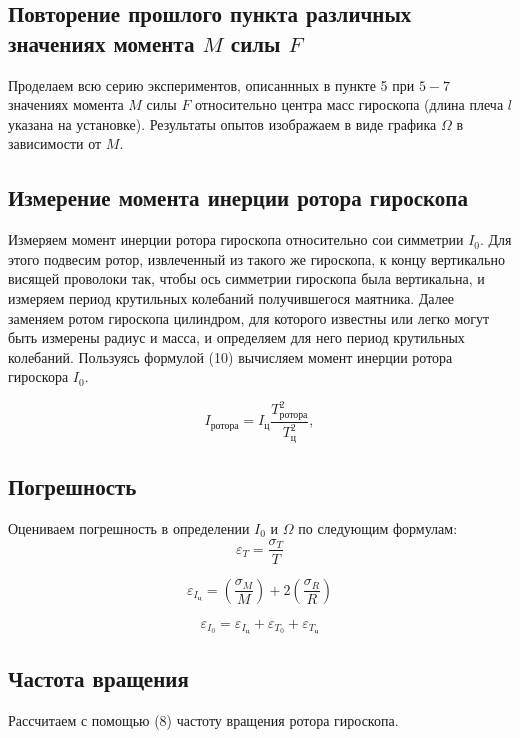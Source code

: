 \documentclass[a4paper,12pt]{article}
\begin{document}
\subsection{Повторение прошлого пункта различных значениях момента $M$ силы $F$}
Проделаем всю серию экспериментов, описаннных в пункте 5 при $5-7$ значениях момента $M$ силы $F$ относительно центра масс гироскопа (длина плеча $l$ указана на установке). Результаты опытов изображаем в виде графика $\Omega$ в зависимости от $M$. 

\subsection{Измерение момента инерции ротора гироскопа}
Измеряем момент инерции ротора гироскопа относительно сои симметрии $I_0$. Для этого подвесим ротор, извлеченный из такого же гироскопа, к концу вертикально висящей проволоки так, чтобы ось симметрии гироскопа была вертикальна, и измеряем период крутильных колебаний получившегося маятника. Далее заменяем ротом гироскопа цилиндром, для которого известны или легко могут быть измерены радиус и масса, и определяем для него период крутильных колебаний. Пользуясь формулой (10) вычисляем момент инерции ротора гироскора $I_0$.

\begin{equation}
	I_{\text{ротора}}= I_{\text{ц}}\frac{T_{\text{ротора}}^2}{T_{\text{ц}}^2},
	\label{eq:moment_measuring_equation}
\end{equation}

\subsection{Погрешность}
Оцениваем погрешность в определении $I_0$ и $\Omega$ по следующим формулам:
\begin{equation}
	\varepsilon_{T} = \frac{\sigma_{T}}{T}
\end{equation}	

\begin{equation}
	\varepsilon_{I_{\text{ц}}} = \left(\frac{\sigma_{M}}{M}\right) + 2\left(\frac{\sigma_{R}}{R}\right)
\end{equation}	

\begin{equation}
	\varepsilon_{I_{0}} = \varepsilon_{I_{\text{ц}}} + \varepsilon_{T_{0}} + \varepsilon_{T_{\text{ц}}}
\end{equation}


\subsection{Частота вращения}
Рассчитаем с помощью (8) частоту вращения ротора гироскопа.
\end{document}
